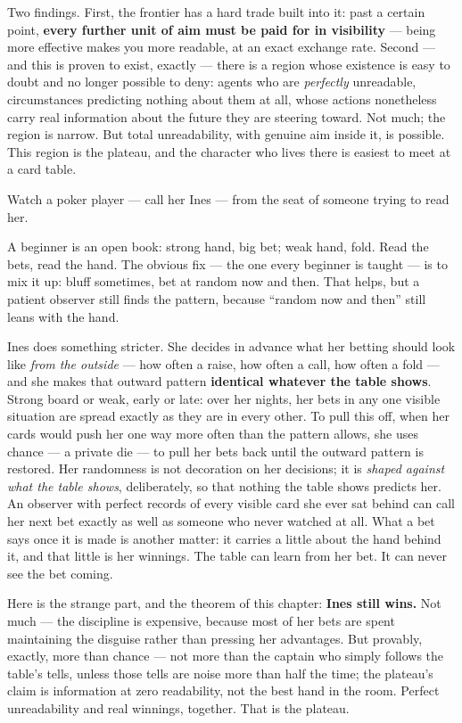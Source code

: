 Two findings. First, the frontier has a hard trade built into it:
past a certain point, \textbf{every further unit of aim must be paid for in
visibility} --- being more effective makes you more readable, at an
exact exchange rate. Second --- and this is proven to exist, exactly ---
there is a region whose existence is easy to doubt and no longer
possible to deny:
agents who are \emph{perfectly} unreadable, circumstances predicting nothing
about them at all, whose actions nonetheless carry real information
about the future they are steering toward. Not much; the region is
narrow. But total
unreadability, with genuine aim inside it, is possible. This region
is the plateau, and the character who lives there is easiest to
meet at a card table.


Watch a poker player --- call her Ines --- from the seat of someone trying
to read her.

A beginner is an open book: strong hand, big bet; weak hand, fold.
Read the bets, read the hand. The obvious fix --- the one every beginner
is taught --- is to mix it up: bluff sometimes, bet at random now and
then. That helps, but a patient observer still finds the pattern,
because ``random now and then'' still leans with the hand.

Ines does something stricter. She decides in advance what her betting
should look like \emph{from the outside} --- how often a raise, how often a
call, how often a fold --- and she makes that outward pattern
\textbf{identical whatever the table shows}. Strong board or weak, early or
late: over her nights, her bets in any one visible situation are
spread exactly as they are in every other. To pull this off, when her
cards would push her one way more often than the pattern allows, she
uses chance --- a private die --- to pull her bets back until the outward
pattern is restored. Her randomness is not decoration on her
decisions; it is \emph{shaped against what the table shows}, deliberately,
so that nothing the table shows predicts her. An observer with perfect
records of every visible card she ever sat behind can call her next
bet exactly as well as someone who never watched at all. What a bet
says once it is made is another matter: it carries a little about the
hand behind it, and that little is her winnings. The table can learn
from her bet. It can never see the bet coming.

Here is the strange part, and the theorem of this chapter: \textbf{Ines still
wins.} Not much --- the discipline is expensive, because most of her
bets are spent maintaining the disguise rather than pressing her
advantages. But provably, exactly, more than chance --- not more than
the captain who simply follows the table's tells, unless those tells
are noise more than half the time; the plateau's claim is information at zero
readability, not the best hand in the room. Perfect unreadability and
real winnings, together. That is the plateau.

